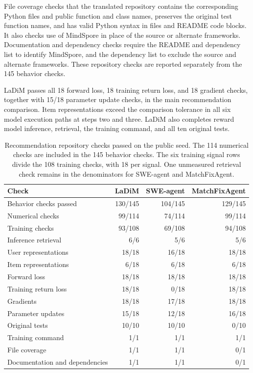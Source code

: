 \documentclass{article}
\begin{document}
File coverage checks that the translated repository contains the corresponding Python files and public function and class names, preserves the original test function names, and has valid Python syntax in files and README code blocks. It also checks use of MindSpore in place of the source or alternate frameworks. Documentation and dependency checks require the README and dependency list to identify MindSpore, and the dependency list to exclude the source and alternate frameworks. These repository checks are reported separately from the 145 behavior checks.

LaDiM passes all 18 forward loss, 18 training return loss, and 18 gradient checks, together with 15/18 parameter update checks, in the main recommendation comparison. Item representations exceed the comparison tolerance in all six model execution paths at steps two and three. LaDiM also completes reward model inference, retrieval, the training command, and all ten original tests.
\begin{table}[!t]
\caption{Recommendation repository checks passed on the public seed. The 114 numerical checks are included in the 145 behavior checks. The six training signal rows divide the 108 training checks, with 18 per signal. One unmeasured retrieval check remains in the denominators for SWE-agent and MatchFixAgent.}
\label{tab:repository-checks}
\centering
\small
\setlength{\tabcolsep}{4pt}

\begin{tabular*}{\linewidth}{@{\extracolsep{\fill}}lrrr@{}}
\toprule
\textbf{Check} & \textbf{LaDiM} & \textbf{SWE-agent} & \textbf{MatchFixAgent} \\
\midrule
Behavior checks passed & 130/145 & 104/145 & 129/145 \\
Numerical checks & 99/114 & 74/114 & 99/114 \\
Training checks & 93/108 & 69/108 & 94/108 \\
Inference retrieval & 6/6 & 5/6 & 5/6 \\
\midrule
User representations & 18/18 & 16/18 & 18/18 \\
Item representations & 6/18 & 6/18 & 6/18 \\
Forward loss & 18/18 & 18/18 & 18/18 \\
Training return loss & 18/18 & 0/18 & 18/18 \\
Gradients & 18/18 & 17/18 & 18/18 \\
Parameter updates & 15/18 & 12/18 & 16/18 \\
\midrule
Original tests & 10/10 & 10/10 & 0/10 \\
Training command & 1/1 & 1/1 & 1/1 \\
File coverage & 1/1 & 1/1 & 0/1 \\
Documentation and dependencies & 1/1 & 1/1 & 0/1 \\
\bottomrule
\end{tabular*}


\end{table}
\end{document}
